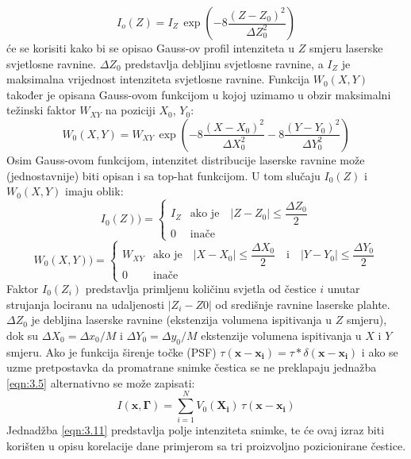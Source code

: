\begin{equation}
	I_{o}(Z) = I_{Z}\, \exp\left(-8\dfrac{(Z-Z_{0})^{2}}{\Delta Z_{0}^{2}}\right)
	\label{eqn:3.7}
\end{equation}
će se korisiti kako bi se opisao Gauss-ov profil intenziteta u $Z$ smjeru laserske svjetlosne ravnine. $\Delta Z_{0}$ predstavlja debljinu svjetlosne ravnine, a $I_{Z}$ je maksimalna vrijednost intenziteta svjetlosne ravnine. Funkcija $W_{0}(X, Y)$ također je opisana Gauss-ovom funkcijom u kojoj uzimamo u obzir maksimalni težinski faktor $W_{XY}$ na poziciji $X_{0}$, $Y_{0}$:
\begin{equation}
	W_{0}(X, Y)=W_{XY}\, \exp \left(-8\dfrac{(X-X_{0})^{2}}{\Delta X_{0}^{2}}-8\dfrac{(Y-Y_{0})^{2}}{\Delta Y_{0}^{2}}\right)
	\label{eqn:3.8}
\end{equation}
Osim Gauss-ovom funkcijom, intenzitet distribucije laserske ravnine može (jednostavnije) biti opisan i sa top-hat funkcijom. U tom slučaju $I_{0}(Z)$ i $W_{0}(X, Y)$ imaju oblik:
\begin{equation}
	I_{0}(Z))=\begin{cases}
		I_{Z} &\text{ako je}\quad |Z-Z_{0}|\leq \dfrac{\Delta Z_{0}}{2}\\
		0 &\text{inače}
	\end{cases}
	\label{eqn:3.9}
\end{equation}
\begin{equation}
	W_{0}(X, Y))=\begin{cases}
		W_{XY} &\text{ako je}\quad |X-X_{0}|\leq \dfrac{\Delta X_{0}}{2}\quad \text{i}\quad |Y-Y_{0}|\leq \dfrac{\Delta Y_{0}}{2}\\
		0 &\text{inače}
	\end{cases}
	\label{eqn:3.10}
\end{equation}
Faktor $I_{0}(Z_{i})$ predstavlja primljenu količinu svjetla od čestice $i$ unutar strujanja lociranu na udaljenosti $|Z_{i}-Z{0}|$ od središnje ravnine laserske plahte. $\Delta Z_{0}$ je debljina laserske ravnine (ekstenzija volumena ispitivanja u $Z$ smjeru), dok su $\Delta X_{0}=\Delta x_{0}/M$ i $\Delta Y_{0}=\Delta y_{0}/M$ ekstenzije volumena ispitivanja u $X$ i $Y$ smjeru. Ako je funkcija širenje točke (PSF) $\tau (\boldsymbol{x}-\boldsymbol{x_{i}})=\tau \ast \delta (\boldsymbol{x}-\boldsymbol{x_{i}})$ i ako se uzme pretpostavka da promatrane snimke čestica se ne preklapaju jednažba \ref{eqn:3.5} alternativno se može zapisati:
\begin{equation}
	I(\boldsymbol{x}, \boldsymbol{\Gamma})=\sum_{i=1}^{N}V_{0}(\boldsymbol{X_{i}})\, \tau (\boldsymbol{x}-\boldsymbol{x_{i}})
	\label{eqn:3.11}
\end{equation}
Jednadžba \ref{eqn:3.11} predstavlja polje intenziteta snimke, te će ovaj izraz biti korišten u opisu korelacije dane primjerom sa tri proizvoljno pozicionirane čestice.
\FloatBarrier
